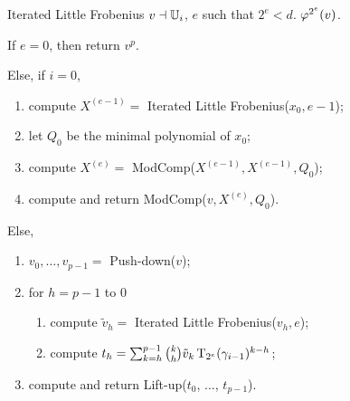 \begin{figure}[!htb]
  \begin{algorithm}
    {Iterated Little Frobenius}
    {$v\dashv\mathbb{U}_i$, $e$ such that $2^e<d$.}
    {$\varphi^{2^e}(v)$.}
  \item \label{alg:l-frob:base-n} If $e = 0$, then return $v^p$.
  \item \label{alg:l-frob:modcomp} Else, if $i=0$,
    \begin{enumerate}
    \item \label{alg:l-frob:rec1}compute $X^{(e-1)}=$ Iterated Little
      Frobenius($x_0, e-1$);
    \item let $Q_0$ be the minimal polynomial of $x_0$;
    \item \label{alg:l-frob:e}compute $X^{(e)}=$
      ModComp($X^{(e-1)},X^{(e-1)},Q_0$);
    \item \label{alg:l-frob:v-e} compute and return
      ModComp($v,X^{(e)},Q_0$).
    \end{enumerate}
  \item \label{alg:l-frob:i}Else,
    \begin{enumerate}
    \item \label{alg:l-frob:push} $v_0, \ldots, v_{p-1} = $
      Push-down($v$);
    \item \label{alg:l-frob:for} for $h = p-1$ to $0$
      \begin{enumerate}
      \item \label{alg:l-frob:rec} compute $\tilde{v}_h = $ Iterated
	Little Frobenius($v_h, e$);
      \item \label{alg:l-frob:comp} compute $t_h = \sum_{k=h}^{p-1}
	\binom{k}{h}\tilde{v}_k\operatorname{T}_{2^e}(\gamma_{i-1})^{k-h}$;
      \end{enumerate}
    \item \label{alg:l-frob:lift} compute and return Lift-up($t_0$,
    $\ldots$, $t_{p-1}$).
    \end{enumerate}
  \end{algorithm}
\end{figure}

